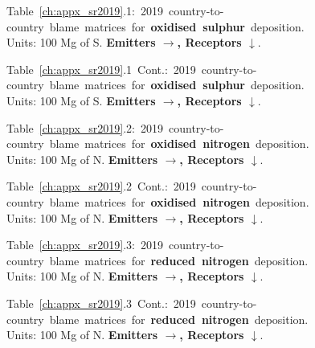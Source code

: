 \footnotesize{\mbox{Table \ref{ch:appx_sr2019}.1: 2019
    country-to-country blame matrices for \textbf{oxidised sulphur}
    deposition.}\\ Units: 100 Mg of S. \textbf{Emitters
      $\rightarrow$, Receptors $\downarrow$}. }\\[\baselineskip]\enlargethispage{\myenlarge} \hspace{-0.5cm} 
\centerline{}\clearpage
\footnotesize{\mbox{Table \ref{ch:appx_sr2019}.1 Cont.: 2019
    country-to-country blame matrices for \textbf{oxidised sulphur}
    deposition.}\\ Units: 100 Mg of S. \textbf{Emitters
      $\rightarrow$, Receptors $\downarrow$}. }\\[\baselineskip]\enlargethispage{\myenlarge} \hspace{-0.5cm} 
\centerline{}\clearpage

\footnotesize{\mbox{Table \ref{ch:appx_sr2019}.2: 2019 country-to-country blame matrices for \textbf{oxidised nitrogen} deposition.}\\ Units: 100 Mg of N. \textbf{Emitters $\rightarrow$, Receptors $\downarrow$}. }\\[\baselineskip]\enlargethispage{\myenlarge} \hspace{-0.5cm} 
\centerline{}\clearpage
\footnotesize{\mbox{Table \ref{ch:appx_sr2019}.2 Cont.: 2019 country-to-country blame matrices for \textbf{oxidised nitrogen} deposition.}\\ Units: 100 Mg of N. \textbf{Emitters $\rightarrow$, Receptors $\downarrow$}. }\\[\baselineskip]\enlargethispage{\myenlarge} \hspace{-0.5cm} 
\centerline{}\clearpage

\footnotesize{\mbox{Table \ref{ch:appx_sr2019}.3: 2019 country-to-country blame matrices for \textbf{reduced nitrogen} deposition.}\\ Units: 100 Mg of N. \textbf{Emitters $\rightarrow$, Receptors $\downarrow$}. }\\[\baselineskip]\enlargethispage{\myenlarge} \hspace{-0.5cm} 
\centerline{}\clearpage
\footnotesize{\mbox{Table \ref{ch:appx_sr2019}.3 Cont.: 2019 country-to-country blame matrices for \textbf{reduced nitrogen} deposition.}\\ Units: 100 Mg of N. \textbf{Emitters $\rightarrow$, Receptors $\downarrow$}. }\\[\baselineskip]\enlargethispage{\myenlarge} \hspace{-0.5cm} 
\centerline{}\clearpage

